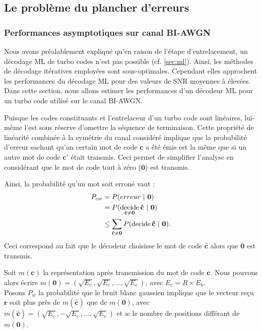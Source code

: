 \subsection{Le problème du plancher d'erreurs}

\subsubsection{Performances asymptotiques sur canal BI-AWGN}
Nous avons préalablement expliqué qu'en raison de l'étape d'entrelacement, un décodage ML de turbo codes n'est pas possible (cf. \ref{sec:ml}). 
Ainsi, les méthodes de décodage itératives employées sont sous-optimales. Cependant elles approchent les performances du décodage ML 
pour des valeurs de SNR moyennes à élevées.
Dans cette section, nous allons estimer les performances d'un décodeur ML pour un turbo code utilisé sur le canal BI-AWGN.

Puisque les codes constituants et l'entrelaceur d'un turbo code sont linéaires, lui-même l'est sous réserve d'omettre la 
séquence de terminaison. Cette propriété de linéarité combinée à la symétrie du canal considéré implique que la probabilité 
d'erreur sachant qu'un certain mot de code $\mathbf{c}$ a été émis est la même que si un autre mot de code $\mathbf{c'}$ 
était transmis. Ceci permet de simplifier l'analyse en considérant que le mot de code tout à zéro ($\mathbf{0}$) est transmis.

Ainsi, la probabilité qu'un mot soit erroné vaut : 
\begin{align}\label{eq:err}
	P_{cw} & = P(erreur~|~\mathbf{0}) \notag                                                             \\
	       & = P( \operatorname*{decide}\limits_{\mathbf{\hat{c}}\neq \mathbf{0}} \mathbf{\hat{c}}~|~\mathbf{0}) \notag \\
	       & \le \sum\limits_{\mathbf{\hat{c}}\neq \mathbf{0}}P( \operatorname*{decide} \mathbf{\hat{c}}~|~\mathbf{0}). 
\end{align}
Ceci correspond au fait que le décodeur choisisse le mot de code $\mathbf{\hat{c}}$ alors que $\mathbf{0}$ est transmis.

Soit $m(\mathbf{c})$ la représentation après transmission du mot de code $\mathbf{c}$. Nous pouvons alors écrire 
$m(\mathbf{0}) = (\sqrt{E_c},\sqrt{E_c},...,\sqrt{E_c})$, avec $E_c = R\times E_b$.\\
Posons $P_w$ la probabilité que le bruit blanc gaussien implique que le vecteur reçu $\mathbf{r}$ soit plus près de  
$m(\mathbf{\hat{c}})$ que de $m(\mathbf{0})$, avec $m(\mathbf{\hat{c}}) = (\sqrt{E_c},-\sqrt{E_c},...,\sqrt{E_c})$ et 
$w$ le nombre de positions différant de $m(\mathbf{0})$.

